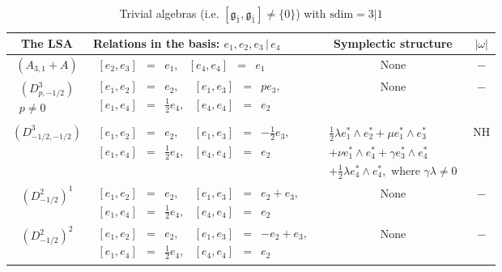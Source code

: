 \documentclass[12pt]{amsart}
\begin{document}
\begin{table}[H]
\centering
\begin{tabular}{| c | l | c |c|}\hline
 The LSA & Relations in the basis: $e_1, e_2, e_3 \, |\, e_4$& Symplectic structure & $|\omega|$ \\ \hline
 $(A_{3,1}+A)$ & $
\begin{array}{lcrlcl}
[e_2, e_3]&=&e_1, & [e_4, e_4]&=&e_1
\end{array}$ & None & $-$\\ \hline
$\begin{array}{l}
(D^3_{p, -1/2})\\[1mm]
p\not =0
\end{array}$ & $
\begin{array}{lcrlcl}
[e_1, e_2]&=&e_2, & [e_1, e_3]&=&p e_3 , \\[1mm]
[e_1, e_4]&=&\frac{1}{2}e_4, & [e_4, e_4]&=& e_2\\[1mm]
\end{array}$ & None & $-$\\ \hline
$(D^3_{-1/2, -1/2})$ & $
\begin{array}{lcrlcl}
[e_1, e_2]&=&e_2, & [e_1, e_3]&=&- \frac{1}{2} e_3 , \\[1mm]
[e_1, e_4]&=&\frac{1}{2}e_4, & [e_4, e_4]&=& e_2\\[1mm]
\end{array}$ & $\begin{array}{l}
\frac{1}{2} \lambda e_1^*\wedge e_2^*+ \mu e_1^*\wedge e_3^*\\[1mm]
+ \nu e_1^*\wedge e_4^*+\gamma e_3^*\wedge e_4^*\\[1mm]
+\frac{1}{2}\lambda e_4^*\wedge e_4^*, \text{ where }\gamma \lambda\not =0
\end{array}$ & NH\\ \hline
 $(D^2_{-1/2})^1$ & $
\begin{array}{lcrlcl}
[e_1, e_2]&=&e_2, & [e_1, e_3]&=&e_2+e_3 , \\[1mm]
[e_1, e_4]&=&\frac{1}{2}e_4, & [e_4, e_4]&=&e_2
\end{array}$ & None & $-$\\ \hline
 $(D^2_{-1/2})^2$ & $
\begin{array}{lcrlcl}
[e_1, e_2]&=&e_2, & [e_1, e_3]&=&-e_2+e_3 , \\[1mm]
[e_1, e_4]&=&\frac{1}{2}e_4, & [e_4, e_4]&=&e_2
\end{array}$ & None & $-$\\ \hline
\end{tabular}
\caption{Trivial algebras (i.e. $[\mathfrak{g}_{\bar 1}, \mathfrak{g}_{\bar 1}]\not =\{0\}$) with $\mathrm{sdim}=3|1$}\label{tab5}
\end{table}
\end{document}
